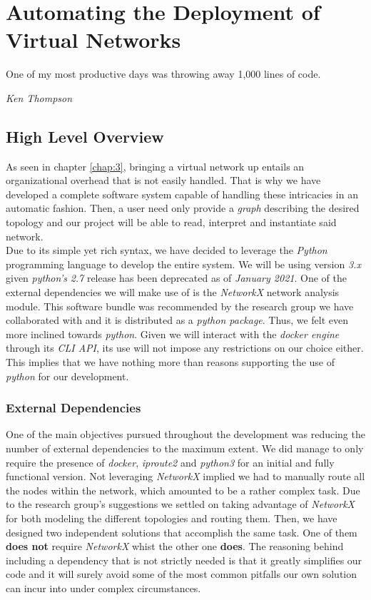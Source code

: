 \chapter{Automating the Deployment of Virtual Networks} \label{chap:4}
    \epigraph{One of my most productive days was throwing away 1,000 lines of code.}{\textit{Ken Thompson}}

    \section{High Level Overview}
        As seen in chapter \ref{chap:3}, bringing a virtual network up entails an organizational overhead that is not easily handled. That is why we have developed a complete software system capable of handling these intricacies in an automatic fashion. Then, a user need only provide a \textit{graph} describing the desired topology and our project will be able to read, interpret and instantiate said network.\\

        Due to its simple yet rich syntax, we have decided to leverage the \textit{Python} \cite{bib:python} programming language to develop the entire system. We will be using version \textit{3.x} given \textit{python's} \textit{2.7} release has been deprecated as of \textit{January 2021}. One of the external dependencies we will make use of is the \textit{NetworkX} \cite{bib:networkx} network analysis module. This software bundle was recommended by the research group we have collaborated with and it is distributed as a \textit{python package}. Thus, we felt even more inclined towards \textit{python}. Given we will interact with the \textit{docker engine} through its \textit{CLI API}, its use will not impose any restrictions on our choice either. This implies that we have nothing more than reasons supporting the use of \textit{python} for our development.\\

        \subsection{External Dependencies}
            One of the main objectives pursued throughout the development was reducing the number of external dependencies to the maximum extent. We did manage to only require the presence of \textit{docker}, \textit{iproute2} and \textit{python3} for an initial and fully functional version. Not leveraging \textit{NetworkX} implied we had to manually route all the nodes within the network, which amounted to be a rather complex task. Due to the research group's suggestions we settled on taking advantage of \textit{NetworkX} for both modeling the different topologies and routing them. Then, we have designed two independent solutions that accomplish the same task. One of them \textbf{does not} require \textit{NetworkX} whist the other one \textbf{does}. The reasoning behind including a dependency that is not strictly needed is that it greatly simplifies our code and it will surely avoid some of the most common pitfalls our own solution can incur into under complex circumstances.\\

